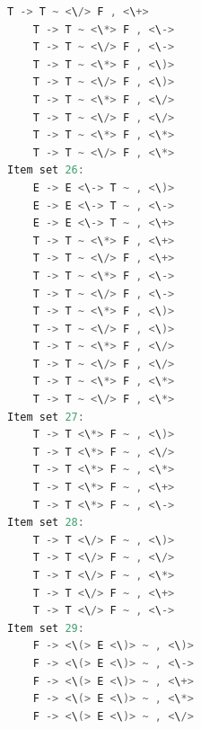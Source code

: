 \begin{lstlisting}[language=c++]
	T -> T ~ <\/> F , <\+>
	T -> T ~ <\*> F , <\->
	T -> T ~ <\/> F , <\->
	T -> T ~ <\*> F , <\)>
	T -> T ~ <\/> F , <\)>
	T -> T ~ <\*> F , <\/>
	T -> T ~ <\/> F , <\/>
	T -> T ~ <\*> F , <\*>
	T -> T ~ <\/> F , <\*>
Item set 26:
	E -> E <\-> T ~ , <\)>
	E -> E <\-> T ~ , <\->
	E -> E <\-> T ~ , <\+>
	T -> T ~ <\*> F , <\+>
	T -> T ~ <\/> F , <\+>
	T -> T ~ <\*> F , <\->
	T -> T ~ <\/> F , <\->
	T -> T ~ <\*> F , <\)>
	T -> T ~ <\/> F , <\)>
	T -> T ~ <\*> F , <\/>
	T -> T ~ <\/> F , <\/>
	T -> T ~ <\*> F , <\*>
	T -> T ~ <\/> F , <\*>
Item set 27:
	T -> T <\*> F ~ , <\)>
	T -> T <\*> F ~ , <\/>
	T -> T <\*> F ~ , <\*>
	T -> T <\*> F ~ , <\+>
	T -> T <\*> F ~ , <\->
Item set 28:
	T -> T <\/> F ~ , <\)>
	T -> T <\/> F ~ , <\/>
	T -> T <\/> F ~ , <\*>
	T -> T <\/> F ~ , <\+>
	T -> T <\/> F ~ , <\->
Item set 29:
	F -> <\(> E <\)> ~ , <\)>
	F -> <\(> E <\)> ~ , <\->
	F -> <\(> E <\)> ~ , <\+>
	F -> <\(> E <\)> ~ , <\*>
	F -> <\(> E <\)> ~ , <\/>


\end{lstlisting}
